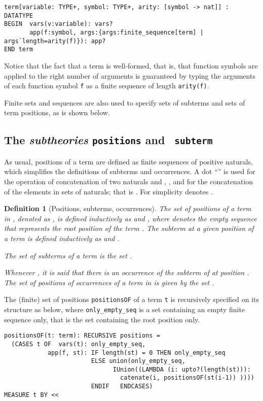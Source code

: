 \documentclass[submission,copyright,creativecommons]{eptcs}
\newtheorem{definition}{Definition}
\begin{document}
{\small
\begin{verbatim}
term[variable: TYPE+, symbol: TYPE+, arity: [symbol -> nat]] : DATATYPE
BEGIN  vars(v:variable): vars?
       app(f:symbol, args:{args:finite_sequence[term] | args`length=arity(f)}): app?
END term
\end{verbatim}}

  Notice that the fact that a term is well-formed, that is, that
  function symbols are applied to the right number of arguments is
  guaranteed by typing the arguments of each function symbol {\tt f}
  as a finite sequence of length {\tt arity(f)}.

  Finite sets and sequences are also used to specify sets of subterms
  and sets of term positions, as is shown below.


  \subsection{The \emph{subtheories} {\tt positions} and {\tt
      subterm}}

  As usual, positions of a term are defined as finite sequences of
  positive naturals, which simplifies the definitions of subterms and
  occurrences.  A dot ``'' is used for the operation of
  concatenation of two naturals  and , , and for the
  concatenation of the elements in sets of naturals; that is . For simplicity 
  denotes .

\begin{definition}[Positions, subterms, occurrences]
  The set of positions of a term  in , denoted as
  , is defined inductively as  and ,
  where  denotes the empty sequence that represents the
  \emph{root position} of the term .
 The subterm at a given position  of a term  is
  defined inductively as  and .

  The set of subterms of a term  is the set .

  Whenever , it is said that there is an occurrence of the
  subterm  of  at position . The set of positions of
  occurrences of a term  in  is given by the set .
\end{definition}

The (finite) set of positions {\tt positionsOF} of a term {\tt t} is recursively
specified on its structure as below, where {\tt only\_empty\_seq} is
a set containing an empty finite sequence only, that is the set
containing the root position only.

{\small
\begin{verbatim}
positionsOF(t: term): RECURSIVE positions =
  (CASES t OF  vars(t): only_empty_seq,
            app(f, st): IF length(st) = 0 THEN only_empty_seq 
                        ELSE union(only_empty_seq,
                              IUnion((LAMBDA (i: upto?(length(st))):
                                catenate(i, positionsOF(st(i-1)) ))))
                        ENDIF   ENDCASES)
MEASURE t BY << 
\end{verbatim}}
\end{document}
